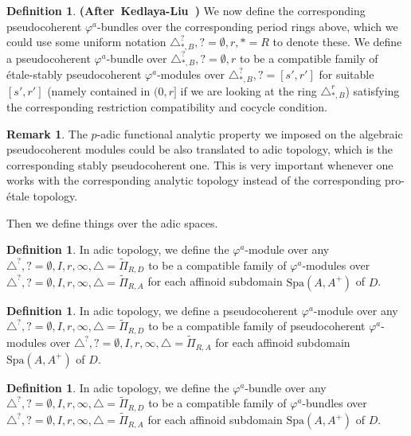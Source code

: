 \documentclass[12pt]{amsart}
\theoremstyle{definition}
\newtheorem{definition}[theorem]{Definition}
\newtheorem{remark}[theorem]{Remark}
\numberwithin{equation}{section}
\begin{document}
\begin{definition} \mbox{\bf{(After Kedlaya-Liu \cite[Definition 4.4.6]{KL2})}}
We now define the corresponding pseudocoherent $\varphi^a$-bundles over the corresponding period rings above, which we could use some uniform notation $\triangle_{*,B}^?,?=\emptyset,r,*=R$ to denote these. We define a pseudocoherent $\varphi^a$-bundle over $\triangle_{*,B}^?,?=\emptyset,r$ to be a compatible family of \'etale-stably pseudocoherent $\varphi^a$-modules over $\triangle_{*,B}^?,?=[s',r']$ for suitable $[s',r']$ (namely contained in $(0,r]$ if we are looking at the ring $\triangle_{*,B}^r$) satisfying the corresponding restriction compatibility and cocycle condition.
\end{definition}



\begin{remark}
The $p$-adic functional analytic property we imposed on the algebraic pseudocoherent modules could be also translated to adic topology, which is the corresponding stably pseudocoherent one. This is very important whenever one works with the corresponding analytic topology instead of the corresponding pro-\'etale topology.	
\end{remark}




\indent Then we define things over the adic spaces.


\begin{definition}
In adic topology, we define the $\varphi^a$-module over any $\triangle^?,?=\emptyset,I,r,\infty,\triangle=\widetilde{\Pi}_{R,D}$ to be a compatible family of $\varphi^a$-modules over $\triangle^?,?=\emptyset,I,r,\infty,\triangle=\widetilde{\Pi}_{R,A}$ for each affinoid subdomain $\mathrm{Spa}(A,A^+)$ of $D$.	
\end{definition}


\begin{definition}
In adic topology, we define a pseudocoherent $\varphi^a$-module over any $\triangle^?,?=\emptyset,I,r,\infty,\triangle=\widetilde{\Pi}_{R,D}$ to be a compatible family of pseudocoherent $\varphi^a$-modules over $\triangle^?,?=\emptyset,I,r,\infty,\triangle=\widetilde{\Pi}_{R,A}$ for each affinoid subdomain $\mathrm{Spa}(A,A^+)$ of $D$.	
\end{definition}

\begin{definition}
In adic topology, we define the $\varphi^a$-bundle over any $\triangle^?,?=\emptyset,I,r,\infty,\triangle=\widetilde{\Pi}_{R,D}$ to be a compatible family of $\varphi^a$-bundles over $\triangle^?,?=\emptyset,I,r,\infty,\triangle=\widetilde{\Pi}_{R,A}$ for each affinoid subdomain $\mathrm{Spa}(A,A^+)$ of $D$.	
\end{definition}
\end{document}
